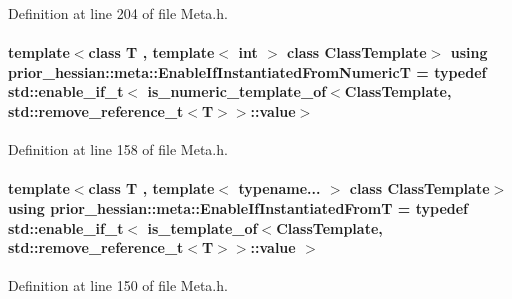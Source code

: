 Definition at line 204 of file Meta.\+h.

\paragraph[{\texorpdfstring{Enable\+If\+Instantiated\+From\+NumericT}{EnableIfInstantiatedFromNumericT}}]{\setlength{\rightskip}{0pt plus 5cm}template$<$class T , template$<$ int $>$ class Class\+Template$>$ using {\bf prior\+\_\+hessian\+::meta\+::\+Enable\+If\+Instantiated\+From\+NumericT} = typedef std\+::enable\+\_\+if\+\_\+t$<$ {\bf is\+\_\+numeric\+\_\+template\+\_\+of}$<$Class\+Template, std\+::remove\+\_\+reference\+\_\+t$<$T$>$$>$\+::value$>$}\hypertarget{namespaceprior__hessian_1_1meta_a4b18f40222c75d1a3f9955464799c452}{}\label{namespaceprior__hessian_1_1meta_a4b18f40222c75d1a3f9955464799c452}


Definition at line 158 of file Meta.\+h.

\paragraph[{\texorpdfstring{Enable\+If\+Instantiated\+FromT}{EnableIfInstantiatedFromT}}]{\setlength{\rightskip}{0pt plus 5cm}template$<$class T , template$<$ typename... $>$ class Class\+Template$>$ using {\bf prior\+\_\+hessian\+::meta\+::\+Enable\+If\+Instantiated\+FromT} = typedef std\+::enable\+\_\+if\+\_\+t$<$ {\bf is\+\_\+template\+\_\+of}$<$Class\+Template, std\+::remove\+\_\+reference\+\_\+t$<$T$>$$>$\+::value $>$}\hypertarget{namespaceprior__hessian_1_1meta_aeab241d6ef85931a7a35a030036ad6b0}{}\label{namespaceprior__hessian_1_1meta_aeab241d6ef85931a7a35a030036ad6b0}


Definition at line 150 of file Meta.\+h.


